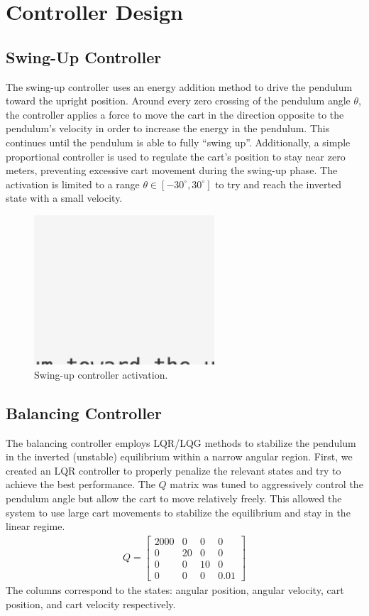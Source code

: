 \documentclass[12pt]{article}
\begin{document}
\section{Controller Design}

\subsection{Swing-Up Controller}
The swing-up controller uses an energy addition method to drive the pendulum toward the upright position.
Around every zero crossing of the pendulum angle $\theta$, the controller applies a force to move the cart in the direction opposite to the pendulum's velocity in order to increase the energy in the pendulum.
This continues until the pendulum is able to fully ``swing up''.
Additionally, a simple proportional controller is used to regulate the cart's position to stay near zero meters, preventing excessive cart movement during the swing-up phase.
The activation is limited to a range $\theta \in [-30^\circ,30^\circ]$ to try and reach the inverted state with a small velocity.


\begin{figure}[H]
    \centering
    \includegraphics[width=0.6\textwidth]{figures/ph.png}
    \caption{Swing-up controller activation.}
    \label{fig:swingup}
\end{figure}

\subsection{Balancing Controller}
The balancing controller employs LQR/LQG methods to stabilize the pendulum in the inverted (unstable) equilibrium within a narrow angular region. 
First, we created an LQR controller to properly penalize the relevant states and try to achieve the best performance. 
The $Q$ matrix was tuned to aggressively control the pendulum angle but allow the cart to move relatively freely. 
This allowed the system to use large cart movements to stabilize the equilibrium and stay in the linear regime.
\begin{align*}
    Q = \begin{bmatrix}
        2000 & 0 & 0 & 0 \\
        0 & 20 & 0 & 0 \\
        0 & 0 & 10 & 0 \\
        0 & 0 & 0 & 0.01
    \end{bmatrix}
\end{align*}
The columns correspond to the states: angular position, angular velocity, cart position, and cart velocity respectively.
\end{document}
